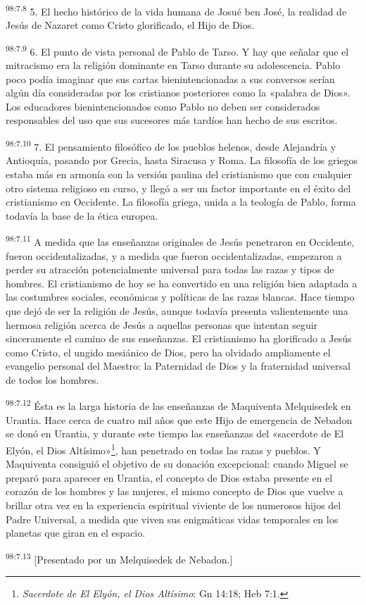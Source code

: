 \par
\textsuperscript{98:7.8} 5. El hecho histórico de la vida humana de Josué ben José, la realidad de Jesús de Nazaret como Cristo glorificado, el Hijo de Dios.

\par
\textsuperscript{98:7.9} 6. El punto de vista personal de Pablo de Tarso. Y hay que señalar que el mitracismo era la religión dominante en Tarso durante su adolescencia. Pablo poco podía imaginar que sus cartas bienintencionadas a sus conversos serían algún día consideradas por los cristianos posteriores como la «palabra de Dios». Los educadores bienintencionados como Pablo no deben ser considerados responsables del uso que sus sucesores más tardíos han hecho de sus escritos.

\par
\textsuperscript{98:7.10} 7. El pensamiento filosófico de los pueblos helenos, desde Alejandría y Antioquía, pasando por Grecia, hasta Siracusa y Roma. La filosofía de los griegos estaba más en armonía con la versión paulina del cristianismo que con cualquier otro sistema religioso en curso, y llegó a ser un factor importante en el éxito del cristianismo en Occidente. La filosofía griega, unida a la teología de Pablo, forma todavía la base de la ética europea.

\par
\textsuperscript{98:7.11} A medida que las enseñanzas originales de Jesús penetraron en Occidente, fueron occidentalizadas, y a medida que fueron occidentalizadas, empezaron a perder su atracción potencialmente universal para todas las razas y tipos de hombres. El cristianismo de hoy se ha convertido en una religión bien adaptada a las costumbres sociales, económicas y políticas de las razas blancas. Hace tiempo que dejó de ser la religión de Jesús, aunque todavía presenta valientemente una hermosa religión acerca de Jesús a aquellas personas que intentan seguir sinceramente el camino de sus enseñanzas. El cristianismo ha glorificado a Jesús como Cristo, el ungido mesiánico de Dios, pero ha olvidado ampliamente el evangelio personal del Maestro: la Paternidad de Dios y la fraternidad universal de todos los hombres.

\par
\textsuperscript{98:7.12} Ésta es la larga historia de las enseñanzas de Maquiventa Melquisedek en Urantia. Hace cerca de cuatro mil años que este Hijo de emergencia de Nebadon se donó en Urantia, y durante este tiempo las enseñanzas del «sacerdote de El Elyón, el Dios Altísimo»\footnote{\textit{Sacerdote de El Elyón, el Dios Altísimo}: Gn 14:18; Heb 7:1.}, han penetrado en todas las razas y pueblos. Y Maquiventa consiguió el objetivo de su donación excepcional: cuando Miguel se preparó para aparecer en Urantia, el concepto de Dios estaba presente en el corazón de los hombres y las mujeres, el mismo concepto de Dios que vuelve a brillar otra vez en la experiencia espiritual viviente de los numerosos hijos del Padre Universal, a medida que viven sus enigmáticas vidas temporales en los planetas que giran en el espacio.

\par
\textsuperscript{98:7.13} [Presentado por un Melquisedek de Nebadon.]